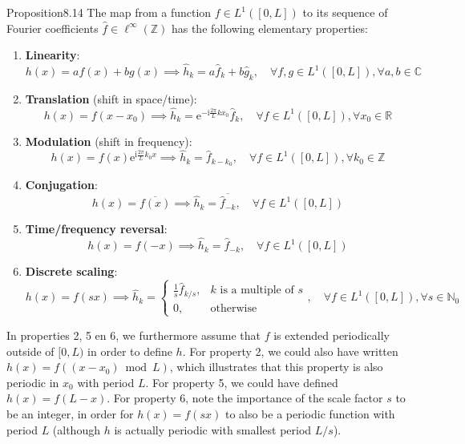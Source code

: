 \begin{res}{Proposition}{8.14}
The map from a function $f\in L^1([0,L])$ to its sequence of Fourier coefficients $\widehat f\in\ell^\infty(\mathbb Z)$ has the following elementary properties:
\begin{enumerate}
\item \textbf{Linearity}:
\begin{equation}h(x)=af(x)+bg(x)\implies\widehat h_k=a\widehat f_k+b\widehat g_k,\quad\forall f,g\in L^1([0,L]),\forall a,b\in\mathbb C\tag{8.66}\end{equation}
\item \textbf{Translation} (shift in space/time):
\begin{equation}h(x)=f(x-x_0)\implies\widehat h_k=\mathrm e^{-\mathrm i\frac{2\pi}{L}kx_0}\widehat f_k,\quad\forall f\in L^1([0,L]),\forall x_0\in\mathbb R\tag{8.67}\end{equation}
\item \textbf{Modulation} (shift in frequency):
\begin{equation}h(x)=f(x)\mathrm e^{\mathrm i\frac{2\pi}{L}k_0x}\implies\widehat h_k=\widehat f_{k-k_0},\quad\forall f\in L^1([0,L]),\forall k_0\in\mathbb Z\tag{8.68}\end{equation}
\item \textbf{Conjugation}:
\begin{equation}h(x)=\overline{f(x)}\implies\widehat h_k=\overline{\widehat f_{-k}},\quad\forall f\in L^1([0,L])\tag{8.69}\end{equation}
\item \textbf{Time/frequency reversal}:
\begin{equation}h(x)=f(-x)\implies\widehat h_k=\widehat f_{-k},\quad\forall f\in L^1([0,L])\tag{8.70}\end{equation}
\item \textbf{Discrete scaling}:
\begin{equation}h(x)=f(sx)\implies\widehat h_k=\begin{cases}\frac1s\widehat f_{k/s},&k\text{ is a multiple of }s\\0,&\text{otherwise}\end{cases},\quad\forall f\in L^1([0,L]),\forall s\in\mathbb N_0\tag{8.71}\end{equation}
\end{enumerate}
In properties 2, 5 en 6, we furthermore assume that $f$ is extended periodically outside of $[0,L)$ in order to define $h$. For property 2, we could also have written $h(x)=f((x-x_0)\bmod L)$, which illustrates that this property is also periodic in $x_0$ with period $L$. For property 5, we could have defined $h(x)=f(L-x)$. For property 6, note the importance of the scale factor $s$ to be an integer, in order for $h(x)=f(sx)$ to also be a periodic function with period $L$ (although $h$ is actually periodic with smallest period $L/s$).
\end{res}

